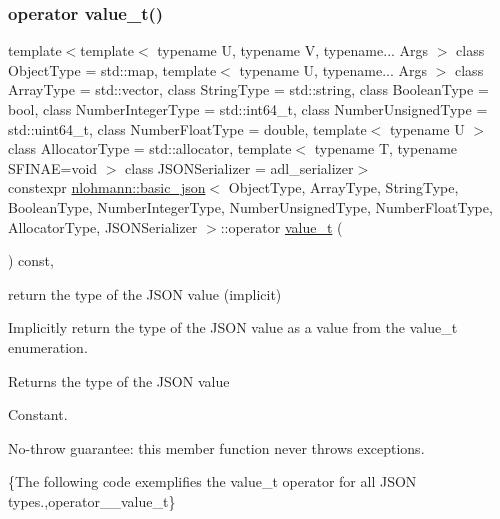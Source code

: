 \subsubsection{\texorpdfstring{operator value\+\_\+t()}{operator value\_t()}}
{\footnotesize\ttfamily template$<$template$<$ typename U, typename V, typename... Args $>$ class Object\+Type = std\+::map, template$<$ typename U, typename... Args $>$ class Array\+Type = std\+::vector, class String\+Type  = std\+::string, class Boolean\+Type  = bool, class Number\+Integer\+Type  = std\+::int64\+\_\+t, class Number\+Unsigned\+Type  = std\+::uint64\+\_\+t, class Number\+Float\+Type  = double, template$<$ typename U $>$ class Allocator\+Type = std\+::allocator, template$<$ typename T, typename S\+F\+I\+N\+A\+E=void $>$ class J\+S\+O\+N\+Serializer = adl\+\_\+serializer$>$ \\
constexpr \mbox{\hyperlink{classnlohmann_1_1basic__json}{nlohmann\+::basic\+\_\+json}}$<$ Object\+Type, Array\+Type, String\+Type, Boolean\+Type, Number\+Integer\+Type, Number\+Unsigned\+Type, Number\+Float\+Type, Allocator\+Type, J\+S\+O\+N\+Serializer $>$\+::operator \mbox{\hyperlink{namespacenlohmann_1_1detail_a1ed8fc6239da25abcaf681d30ace4985}{value\+\_\+t}} (\begin{DoxyParamCaption}{ }\end{DoxyParamCaption}) const\hspace{0.3cm}{\ttfamily [inline]}, {\ttfamily [noexcept]}}



return the type of the J\+S\+ON value (implicit) 

Implicitly return the type of the J\+S\+ON value as a value from the value\+\_\+t enumeration.

\begin{DoxyReturn}{Returns}
the type of the J\+S\+ON value
\end{DoxyReturn}
Constant.

No-\/throw guarantee\+: this member function never throws exceptions.

\{The following code exemplifies the value\+\_\+t operator for all J\+S\+ON types.,operator\+\_\+\+\_\+value\+\_\+t\}

